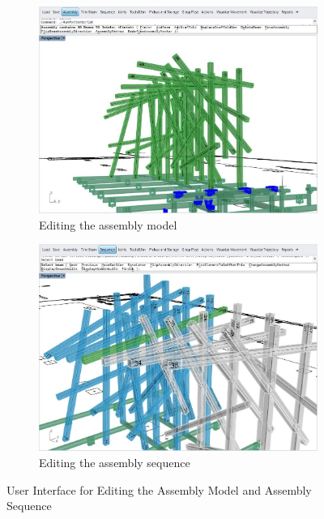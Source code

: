 \begin{figure}[!h]
    \centering
    \begin{subfigure}[b]{0.49\textwidth}
        \centering
        \includegraphics[width=\textwidth]{images/6a/img14.jpg}
        \caption{Editing the assembly model}
        \label{fig:editing-the-assembly-model}
    \end{subfigure}
    \hfill
    \begin{subfigure}[b]{0.49\textwidth}
        \centering
        \includegraphics[width=\textwidth]{images/6a/img15.jpg}
        \caption{Editing the assembly sequence}
        \label{fig:editing-the-assembly-sequence}
    \end{subfigure}
    \caption{User Interface for Editing the Assembly Model and Assembly Sequence}
    \label{fig:user-interface-for-editing}
\end{figure}


